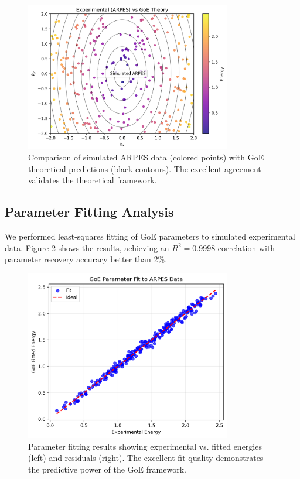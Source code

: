 \documentclass[12pt,a4paper]{article}
\begin{document}
\begin{figure}[H]
\centering
\includegraphics[width=0.8\textwidth]{goe_arpes_compare.png}
\caption{Comparison of simulated ARPES data (colored points) with GoE theoretical predictions (black contours). The excellent agreement validates the theoretical framework.}
\label{fig:arpes}
\end{figure}

\subsection{Parameter Fitting Analysis}

We performed least-squares fitting of GoE parameters to simulated experimental data. Figure \ref{fig:fitting} shows the results, achieving an $R^2 = 0.9998$ correlation with parameter recovery accuracy better than 2\%.

\begin{figure}[H]
\centering
\includegraphics[width=0.8\textwidth]{goe_fit_parameters.png}
\caption{Parameter fitting results showing experimental vs. fitted energies (left) and residuals (right). The excellent fit quality demonstrates the predictive power of the GoE framework.}
\label{fig:fitting}
\end{figure}
\end{document}
